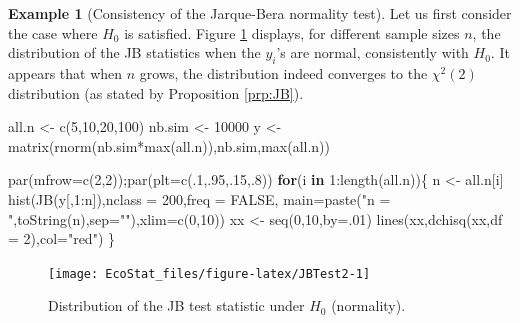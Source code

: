 \documentclass[
  12pt,
]{book}
\newenvironment{Shaded}{\begin{snugshade}}{\end{snugshade}}
\newcommand{\AttributeTok}[1]{\textcolor[rgb]{0.77,0.63,0.00}{#1}}
\newcommand{\ConstantTok}[1]{\textcolor[rgb]{0.00,0.00,0.00}{#1}}
\newcommand{\ControlFlowTok}[1]{\textcolor[rgb]{0.13,0.29,0.53}{\textbf{#1}}}
\newcommand{\DecValTok}[1]{\textcolor[rgb]{0.00,0.00,0.81}{#1}}
\newcommand{\FunctionTok}[1]{\textcolor[rgb]{0.00,0.00,0.00}{#1}}
\newcommand{\NormalTok}[1]{#1}
\newcommand{\OtherTok}[1]{\textcolor[rgb]{0.56,0.35,0.01}{#1}}
\newcommand{\SpecialCharTok}[1]{\textcolor[rgb]{0.00,0.00,0.00}{#1}}
\newcommand{\StringTok}[1]{\textcolor[rgb]{0.31,0.60,0.02}{#1}}
\theoremstyle{definition}
\theoremstyle{definition}
\newtheorem{example}{Example}[chapter]
\theoremstyle{definition}
\theoremstyle{definition}
\theoremstyle{remark}
\begin{document}
\begin{example}[Consistency of the Jarque-Bera normality test]
Let us first consider the case where \(H_0\) is satisfied. Figure \ref{fig:JBTest2} displays, for different sample sizes \(n\), the distribution of the JB statistics when the \(y_i\)'s are normal, consistently with \(H_0\). It appears that when \(n\) grows, the distribution indeed converges to the \(\chi^2(2)\) distribution (as stated by Proposition \ref{prp:JB}).

\begin{Shaded}
\begin{Highlighting}[]
\NormalTok{all.n }\OtherTok{\textless{}{-}} \FunctionTok{c}\NormalTok{(}\DecValTok{5}\NormalTok{,}\DecValTok{10}\NormalTok{,}\DecValTok{20}\NormalTok{,}\DecValTok{100}\NormalTok{)}
\NormalTok{nb.sim }\OtherTok{\textless{}{-}} \DecValTok{10000}
\NormalTok{y }\OtherTok{\textless{}{-}} \FunctionTok{matrix}\NormalTok{(}\FunctionTok{rnorm}\NormalTok{(nb.sim}\SpecialCharTok{*}\FunctionTok{max}\NormalTok{(all.n)),nb.sim,}\FunctionTok{max}\NormalTok{(all.n))}

\FunctionTok{par}\NormalTok{(}\AttributeTok{mfrow=}\FunctionTok{c}\NormalTok{(}\DecValTok{2}\NormalTok{,}\DecValTok{2}\NormalTok{));}\FunctionTok{par}\NormalTok{(}\AttributeTok{plt=}\FunctionTok{c}\NormalTok{(.}\DecValTok{1}\NormalTok{,.}\DecValTok{95}\NormalTok{,.}\DecValTok{15}\NormalTok{,.}\DecValTok{8}\NormalTok{))}
\ControlFlowTok{for}\NormalTok{(i }\ControlFlowTok{in} \DecValTok{1}\SpecialCharTok{:}\FunctionTok{length}\NormalTok{(all.n))\{}
\NormalTok{  n }\OtherTok{\textless{}{-}}\NormalTok{ all.n[i]}
  \FunctionTok{hist}\NormalTok{(}\FunctionTok{JB}\NormalTok{(y[,}\DecValTok{1}\SpecialCharTok{:}\NormalTok{n]),}\AttributeTok{nclass =} \DecValTok{200}\NormalTok{,}\AttributeTok{freq =} \ConstantTok{FALSE}\NormalTok{,}
       \AttributeTok{main=}\FunctionTok{paste}\NormalTok{(}\StringTok{"n = "}\NormalTok{,}\FunctionTok{toString}\NormalTok{(n),}\AttributeTok{sep=}\StringTok{""}\NormalTok{),}\AttributeTok{xlim=}\FunctionTok{c}\NormalTok{(}\DecValTok{0}\NormalTok{,}\DecValTok{10}\NormalTok{))}
\NormalTok{  xx }\OtherTok{\textless{}{-}} \FunctionTok{seq}\NormalTok{(}\DecValTok{0}\NormalTok{,}\DecValTok{10}\NormalTok{,}\AttributeTok{by=}\NormalTok{.}\DecValTok{01}\NormalTok{)}
  \FunctionTok{lines}\NormalTok{(xx,}\FunctionTok{dchisq}\NormalTok{(xx,}\AttributeTok{df =} \DecValTok{2}\NormalTok{),}\AttributeTok{col=}\StringTok{"red"}\NormalTok{)}
\NormalTok{\}}
\end{Highlighting}
\end{Shaded}

\begin{figure}
\texttt{[image: EcoStat\_files/figure-latex/JBTest2-1]} \caption{Distribution of the JB test statistic under $H_0$ (normality).}\label{fig:JBTest2}
\end{figure}


\end{example}
\end{document}
